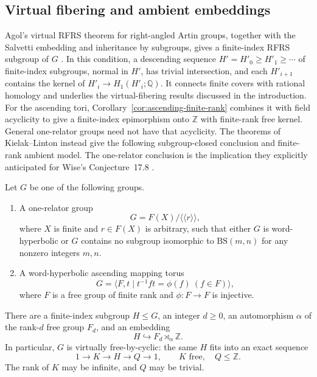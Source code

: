 \subsection{Virtual fibering and ambient embeddings}

Agol's virtual RFRS theorem for right-angled Artin groups, together
with the Salvetti embedding and inheritance by subgroups, gives a
finite-index RFRS subgroup of $G$ \cite[Corollary~2.3]{Agol2008}. In this condition, a descending sequence
$H'=H'_0\geq H'_1\geq\cdots$ of finite-index subgroups, normal in
$H'$, has trivial intersection, and each $H'_{i+1}$ contains the kernel
of $H'_i\to H_1(H'_i;\mathbb Q)$. It connects finite covers with
rational homology and underlies the virtual-fibering results discussed
in the introduction. For the ascending tori,
Corollary~\ref{cor:ascending-finite-rank} combines it with field
acyclicity to give a finite-index epimorphism onto $\mathbb Z$ with
finite-rank free kernel. General one-relator groups need not have that
acyclicity. The theorems of Kielak--Linton instead give the following
subgroup-closed conclusion and finite-rank ambient model. The
one-relator conclusion is the implication they explicitly anticipated
for Wise's Conjecture~17.8 \cite[Section~1.1]{KielakLinton2024Virtually}.

\begin{corollary}\label{cor:free-by-cyclic}
Let $G$ be one of the following groups.
\begin{enumerate}
\item A one-relator group
\[
G=F(X)/\langle\!\langle r\rangle\!\rangle,
\]
where $X$ is finite and $r\in F(X)$ is arbitrary, such that either $G$
is word-hyperbolic or $G$ contains no subgroup isomorphic to
$\mathrm{BS}(m,n)$ for any nonzero integers $m,n$.
\item A word-hyperbolic ascending mapping torus
\[
G=\langle F,t\mid t^{-1}ft=\phi(f)\ (f\in F)\rangle,
\]
where $F$ is a free group of finite rank and $\phi:F\to F$ is injective.
\end{enumerate}
There are a finite-index subgroup $H\leq G$, an integer $d\geq0$, an
automorphism $\alpha$ of the rank-$d$ free group $F_d$, and an embedding
\[
H\hookrightarrow F_d\rtimes_\alpha\mathbb Z.
\]
In particular, $G$ is virtually free-by-cyclic: the same $H$ fits into
an exact sequence
\[
1\longrightarrow K\longrightarrow H\longrightarrow Q\longrightarrow1,
\qquad K\text{ free},\quad Q\leq\mathbb Z.
\]
The rank of $K$ may be infinite, and $Q$ may be trivial.
\end{corollary}

